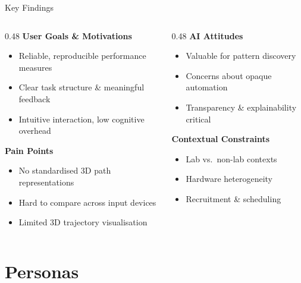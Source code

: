 \documentclass[aspectratio=169, 10pt]{beamer}
\begin{document}
\begin{frame}{Key Findings}
  \begin{columns}[T]
    \begin{column}{0.48\textwidth}
      \textbf{User Goals \& Motivations}
      \begin{itemize}
        \item Reliable, reproducible performance measures
        \item Clear task structure \& meaningful feedback
        \item Intuitive interaction, low cognitive overhead
      \end{itemize}
      \vspace{0.5em}
      \textbf{Pain Points}
      \begin{itemize}
        \item No standardised 3D path representations
        \item Hard to compare across input devices
        \item Limited 3D trajectory visualisation
      \end{itemize}
    \end{column}
    \begin{column}{0.48\textwidth}
      \textbf{AI Attitudes}
      \begin{itemize}
        \item Valuable for pattern discovery
        \item Concerns about opaque automation
        \item Transparency \& explainability critical
      \end{itemize}
      \vspace{0.5em}
      \textbf{Contextual Constraints}
      \begin{itemize}
        \item Lab vs.\ non-lab contexts
        \item Hardware heterogeneity
        \item Recruitment \& scheduling
      \end{itemize}
    \end{column}
  \end{columns}
\end{frame}

\section{Personas}
\end{document}

